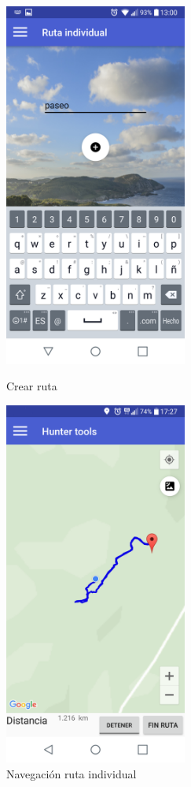 \begin{figure}[htbp]
\begin{minipage}[b]{0.5\linewidth} %
\centering
\includegraphics[width=6cm]{capturamovil/crearruta.png}
\caption{Crear ruta}
 \label{fig:crearruta}

\end{minipage}
\hspace{0.5cm} %
\begin{minipage}[b]{0.5\linewidth}
\centering
\includegraphics[width=6cm]{capturamovil/individual-navegacion.png}
\caption{Navegación ruta individual }
 \label{fig:individual-navegacion}

\end{minipage}
\end{figure}


